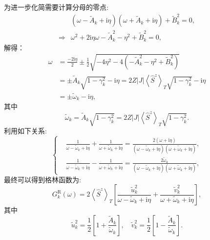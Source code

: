 为进一步化简需要计算分母的零点:
\begin{align}
&\left(\omega-\tilde{A}_{k}+\mathrm{i} \eta\right)\left(\omega+\tilde{A}_{k}+\mathrm{i} \eta\right)+\tilde{B}_{k}^{2}=0 ,\nonumber\\
\Rightarrow&\omega^{2}+2 \mathrm{i} \eta \omega-\tilde{A}_{k}^{2}-\eta^{2}+\tilde{B}_{k}^{2}=0,
\end{align}
解得：
\begin{align}
\omega &=\frac{-2 \mathrm{i} \eta}{2} \pm \frac{1}{2} \sqrt{-4 \eta^{2}-4\left(-\tilde{A}_{k}^{2}-\eta^{2}+\tilde{B}_{k}^{2}\right)} \nonumber\\
&=\pm \tilde{A}_{k} \sqrt{1-\gamma_{k}^{2}}-\mathrm{i} \eta=2 Z|J|\left\langle\hat{S}^{z}\right\rangle_{T} \sqrt{1-\gamma_{k}^{2}}-\mathrm{i} \eta \nonumber\\
&=\pm \tilde{\omega}_{k}-\mathrm{i} \eta ,
\end{align}
其中
\begin{equation}
\tilde{\omega}_{k}=\tilde{A}_{k} \sqrt{1-\gamma_{k}^{2}}=2 Z|J|\left\langle\hat{S}^{z}\right\rangle_{T} \sqrt{1-\gamma_{k}^{2}}.
\end{equation}
利用如下关系:
\begin{equation}
\left\{\begin{aligned}
&\frac{1}{\omega-\tilde{\omega}_{k}+\mathrm{i} \eta}+\frac{1}{\omega+\tilde{\omega}_{k}+\mathrm{i} \eta}=\frac{2(\omega+\mathrm{i} \eta)}{\left(\omega-\tilde{\omega}_{k}+\mathrm{i} \eta\right)\left(\omega+\tilde{\omega}_{k}+\mathrm{i} \eta\right)}, \\
&\frac{1}{\omega-\tilde{\omega}_{k}+\mathrm{i} \eta}-\frac{1}{\omega+\tilde{\omega}_{k}+\mathrm{i} \eta}=\frac{2 \tilde{\omega}_{k}}{\left(\omega-\tilde{\omega}_{k}+\mathrm{i} \eta\right)\left(\omega+\tilde{\omega}_{k}+\mathrm{i} \eta\right)},
\end{aligned}\right.
\end{equation}
最终可以得到格林函数为:
\begin{equation}
G_{k}^\mathrm{R}(\omega)=2\left\langle\hat{S}^{z}\right\rangle_{T}\left[\frac{\tilde{u}_{k}^{2}}{\omega-\tilde{\omega}_{k}+\mathrm{i} \eta}+\frac{\tilde{v}_{k}^{2}}{\omega+\tilde{\omega}_{k}+\mathrm{i} \eta}\right],
\end{equation}
其中
\begin{equation}
\tilde{u}_{k}^{2}=\frac{1}{2}\left[1+\frac{\tilde{A}_{k}}{\tilde{\omega}_{k}}\right], \quad \tilde{v}_{k}^{2}=\frac{1}{2}\left[1-\frac{\tilde{A}_{k}}{\tilde{\omega}_{k}}\right].
\end{equation}
